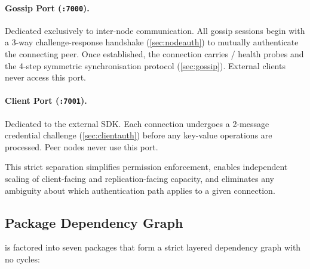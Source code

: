 \paragraph{Gossip Port (\texttt{:7000}).}
Dedicated exclusively to inter-node communication. All gossip sessions begin
with a 3-way challenge-response handshake (\cref{sec:nodeauth}) to mutually
authenticate the connecting peer. Once established, the connection carries
/ health probes and the 4-step symmetric synchronisation
protocol (\cref{sec:gossip}). External clients never access this port.

\paragraph{Client Port (\texttt{:7001}).}
Dedicated to the external  SDK. Each connection undergoes a
2-message credential challenge (\cref{sec:clientauth}) before any key-value
operations are processed. Peer nodes never use this port.

This strict separation simplifies permission enforcement, enables independent
scaling of client-facing and replication-facing capacity, and eliminates any
ambiguity about which authentication path applies to a given connection.

\subsection{Package Dependency Graph}

\pebble{} is factored into seven packages that form a strict layered dependency
graph with no cycles:

